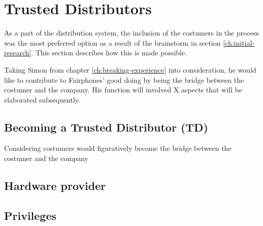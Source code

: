 \documentclass[final]{scrreprt} %
\begin{document}
\chapter{Trusted Distributors} %
\label{ch:trusted-distributors}
As a part of the distribution system, the inclusion of the costumers in the process was the most preferred option as a result of the brainstorm in section \ref{ch:initial-research}. This section describes how this is made possible.

Taking Simon from chapter \ref{ch:breaking-experience} into consideration, he would like to contribute to Fairphones' good doing by being the bridge between the costumer and the company. His function will involved X aspects that will be elaborated subsequently.

\section{Becoming a Trusted Distributor (TD)}
Considering costumers would figuratively become the bridge between the costumer and the company



\section{Hardware provider}

\section{Privileges} 

\end{document}
